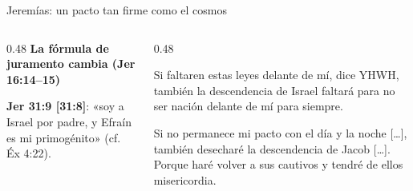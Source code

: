 \begin{frame}{Jeremías: un pacto tan firme como el cosmos}
\begin{columns}[T,onlytextwidth]
\begin{column}{0.48\textwidth}
\centering\textbf{\small\textcolor{cafe}{La fórmula de juramento cambia (Jer 16:14--15)}}\par\medskip
{}
\elabpropia
\vspace{2pt}
{\scriptsize\textbf{Jer 31:9 [31:8]}: «soy a Israel por padre, y Efraín es mi primogénito» (cf. Éx 4:22).}
\end{column}
\begin{column}{0.48\textwidth}
\begin{cita}Si faltaren estas leyes delante de mí, dice YHWH, también la descendencia de Israel faltará para no ser nación delante de mí para siempre.\end{cita}
\begin{cita}[fontupper=\scriptsize\itshape]Si no permanece mi pacto con el día y la noche [\ldots], también desecharé la descendencia de Jacob [\ldots]. Porque haré volver a sus cautivos y tendré de ellos misericordia.\end{cita}
\end{column}
\end{columns}
\end{frame}

